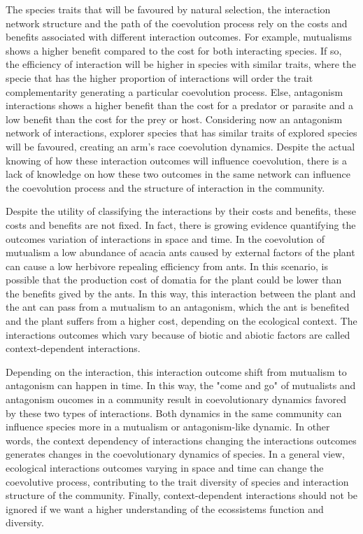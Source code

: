 \documentclass[a4paper, 12pt]{article}
\begin{document}
The species traits that will be favoured by natural selection, the interaction network structure and the path of the coevolution process rely on the costs and benefits associated with different interaction outcomes. For example, mutualisms shows a higher benefit compared to the cost for both interacting species. If so, the efficiency of interaction will be higher in species with similar traits, where  the specie that has the higher proportion of  interactions will order the trait complementarity generating a particular coevolution process. Else, antagonism interactions shows a higher benefit than the cost for a predator or parasite and a low benefit than the cost for the prey or host. Considering now an antagonism network of interactions, explorer species that has similar traits of explored species will be favoured, creating an arm's race coevolution dynamics. Despite the actual knowing of how these interaction outcomes will influence coevolution, there is a lack of knowledge on how these two outcomes in the same network can influence the coevolution process and the structure of interaction in the community.

Despite the utility of classifying the interactions by their costs and benefits, these costs and benefits are not fixed. In fact, there is growing evidence quantifying the outcomes variation of interactions in space and time. In the coevolution of mutualism a low abundance of acacia ants caused by external factors of the plant can cause a low herbivore repealing efficiency from ants. In this scenario, is possible that the production cost of domatia for the plant could be lower than the benefits gived by the ants. In this way, this interaction between the plant and the ant can pass from a mutualism to an antagonism, which the ant is benefited and the plant suffers from a higher cost, depending on the ecological context. The interactions outcomes which vary because of biotic and abiotic factors are called context-dependent interactions.

Depending on the interaction, this interaction outcome shift from mutualism to antagonism can happen in time. In this way, the "come and go" of mutualists and antagonism oucomes in a community result in coevolutionary dynamics favored by these two types of interactions. Both dynamics in the same community can influence species more in a mutualism or antagonism-like dynamic. In other words, the context dependency of interactions changing the interactions outcomes generates changes in the coevolutionary dynamics of species. In a general view, ecological interactions outcomes varying in space and time can change the coevolutive process, contributing to the trait diversity of species and interaction structure of the community. Finally, context-dependent interactions should not be ignored if we want a higher understanding of the ecossistems function and diversity. 
\end{document}
